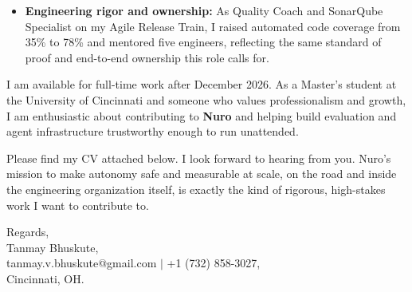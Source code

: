 \documentclass[11pt]{letter}
\begin{document}
\begin{letter}{}
\begin{itemize}[leftmargin=*, itemsep=0.45em]
    \item \textbf{Engineering rigor and ownership:} As Quality Coach and SonarQube Specialist on my Agile Release Train, I raised automated code coverage from 35\% to 78\% and mentored five engineers, reflecting the same standard of proof and end-to-end ownership this role calls for.
\end{itemize}

I am available for full-time work after December 2026. As a Master's student at the University of Cincinnati and someone who values professionalism and growth, I am enthusiastic about contributing to \textbf{Nuro} and helping build evaluation and agent infrastructure trustworthy enough to run unattended.

Please find my CV attached below. I look forward to hearing from you. Nuro's mission to make autonomy safe and measurable at scale, on the road and inside the engineering organization itself, is exactly the kind of rigorous, high-stakes work I want to contribute to.

{\setlength{\parskip}{0pt}
Regards,\\
Tanmay Bhuskute,\\
tanmay.v.bhuskute@gmail.com $\mid$ +1 (732) 858-3027,\\
Cincinnati, OH.
}

\end{letter}
\end{document}
